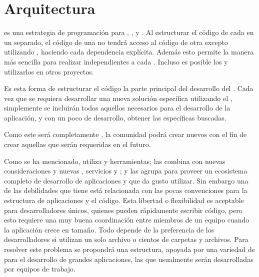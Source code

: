 \chapter{Arquitectura}\label{cap:arquitectura:section:generic_arquitectura}

\packagesAS es una estrategia de programación para \codeSeparationQA, \modularityAS, y \reusabilityQA. Al estructurar el código de cada \featureCPT en un \packagesAS separado, el código de una \featureCPT no tendrá acceso al código de otra \featureCPT excepto utilizando \exportCPT, haciendo cada dependencia explícita. Además esto permite la manera más sencilla para realizar \testingCPT independientes a cada \featureCPT. Incluso es posible \publishINT los \packagesAS y utilizarlos en otros proyectos.

Es esta forma de estructurar el código la parte principal del desarrollo del \frameworkPC \ecommerceCOM. Cada vez que se requiera desarrollar una nueva solución específica utilizando el \frameworkPC, simplemente se incluirán todos aquellos \modulesAS necesarios para el desarrollo de la aplicación, y con un poco de desarrollo, obtener las \featuresCPT específicas buscadas.

Como este \frameworkPC será completamente \openSourcePC, la comunidad podrá crear nuevos \modulesAS con el fin de crear aquellas \featuresCPT que serán requeridas en el futuro.



Como se ha mencionado, \meteorNAME utiliza \librariesPC y herramientas; las combina con nuevas consideraciones y nuevas \librariesPC, servicios y \standards; y las agrupa para proveer un ecosistema completo de desarrollo de aplicaciones \webINT y \mobileINT que da gusto utilizar. Sin embargo una de las debilidades que tiene \meteorNAME está relacionada con las pocas convenciones para la estructura de aplicaciones y el código. Esta libertad o flexibilidad es aceptable para desarrolladores únicos, quienes pueden rápidamente escribir código, pero esto requiere una muy buena coordinación entre miembros de un equipo cuando la aplicación crece en tamaño. Todo depende de la preferencia de los desarrolladores si utilizan un solo archivo o cientos de carpetas y archivos. Para resolver este problema se propondrá una estructura, apoyada por una variedad de \packagesAS para el desarrollo de grandes aplicaciones, las que usualmente serán desarrolladas por equipos de trabajo.

